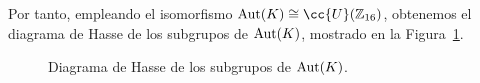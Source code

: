 \begin{ejemplo}
    Por tanto, empleando el isomorfismo $\Aut(K) \cong \cc{U}(\mathbb{Z}_{16})$, obtenemos el diagrama de Hasse de los subgrupos de $\operatorname{Aut}(K)$, mostrado en la Figura~\ref{fig:diagrama_hasse_subgrupos_AutK}.
    \begin{figure}[h]
        \centering
        \caption{Diagrama de Hasse de los subgrupos de $\operatorname{Aut}(K)$.}
        \label{fig:diagrama_hasse_subgrupos_AutK}
    \end{figure}


\end{ejemplo}
